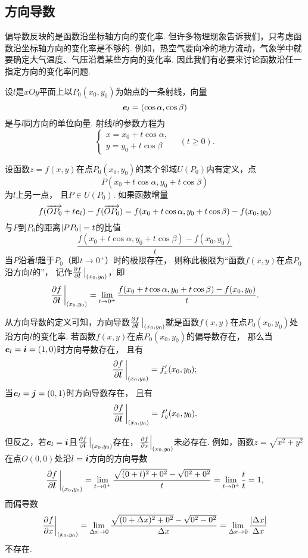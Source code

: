 \subsection{方向导数}
偏导数反映的是函数沿坐标轴方向的变化率.
但许多物理现象告诉我们，只考虑函数沿坐标轴方向的变化率是不够的.
例如，热空气要向冷的地方流动，气象学中就要确定大气温度、气压沿着某些方向的变化率.
因此我们有必要来讨论函数沿任一指定方向的变化率问题.

\begin{definition}
设\(l\)是\(xOy\)平面上以\(P_0(x_0,y_0)\)为始点的一条射线，向量\[
	\boldsymbol{e}_l=(\cos\alpha,\cos\beta)
\]是与\(l\)同方向的单位向量.
射线\(l\)的参数方程为\[
	\left\{ \begin{array}{l}
		x=x_0+t\cos\alpha, \\
		y=y_0+t\cos\beta
	\end{array} \right.
	\quad(t \geq 0).
\]

设函数\(z=f(x,y)\)在点\(P_0(x_0,y_0)\)的某个邻域\(U(P_0)\)内有定义，点\[
	P(x_0+t\cos\alpha,y_0+t\cos\beta)
\]为\(l\)上另一点，
且\(P \in U(P_0)\).
如果函数增量\[
	f(\overrightarrow{O P_0} + t \boldsymbol{e}_l) - f(\overrightarrow{O P_0})
	= f(x_0+t\cos\alpha,y_0+t\cos\beta)-f(x_0,y_0)
\]与\(P\)到\(P_0\)的距离\(\abs{PP_0}=t\)的比值\[
\frac{f(x_0+t\cos\alpha,y_0+t\cos\beta)-f(x_0,y_0)}{t}
\]当\(P\)沿着\(l\)趋于\(P_0\)（即\(t\to0^+\)）时的极限存在，
则称此极限为“函数\(f(x,y)\)在点\(P_0\)沿方向\(l\)的”，
记作\(\pdv{f}{\vb{l}}\eval_{(x_0,y_0)}\)，即\[
\pdv{f}{\vb{l}}\eval_{(x_0,y_0)}
=\lim\limits_{t\to0^+} \frac{f(x_0+t\cos\alpha,y_0+t\cos\beta)-f(x_0,y_0)}{t}.
\]
\end{definition}

从方向导数的定义可知，方向导数\(\pdv{f}{\vb{l}}\eval_{(x_0,y_0)}\)就是函数\(f(x,y)\)在点\(P_0(x_0,y_0)\)处沿方向\(l\)的变化率.
若函数\(f(x,y)\)在点\(P_0(x_0,y_0)\)的偏导数存在，
那么当\(\boldsymbol{e}_l = \boldsymbol{i} = (1,0)\)时方向导数存在，
且有\[
	\pdv{f}{\vb{l}}\eval_{(x_0,y_0)} = f'_x(x_0,y_0);
\]
当\(\boldsymbol{e}_l = \boldsymbol{j} = (0,1)\)时方向导数存在，
且有\[
	\pdv{f}{\vb{l}}\eval_{(x_0,y_0)} = f'_y(x_0,y_0).
\]

但反之，若\(\boldsymbol{e}_l = \boldsymbol{i}\)且\(\pdv{f}{\vb{l}}\eval_{(x_0,y_0)}\)存在，\(\eval{\pdv{f}{x}}_{(x_0,y_0)}\)未必存在.
例如，函数\(z = \sqrt{x^2+y^2}\)在点\(O(0,0)\)处沿\(l = \boldsymbol{i}\)方向的方向导数\[
\pdv{f}{\vb{l}}\eval_{(x_0,y_0)}
= \lim\limits_{t\to0^+} \frac{\sqrt{(0+t)^2+0^2}-\sqrt{0^2+0^2}}{t}
= \lim\limits_{t\to0^+} \frac{t}{t} = 1,
\]而偏导数\[
\eval{\pdv{f}{x}}_{(x_0,y_0)}
= \lim\limits_{\increment x\to0} \frac{\sqrt{(0+\increment x)^2+0^2}-\sqrt{0^2-0^2}}{\increment x}
= \lim\limits_{\increment x\to0} \frac{\abs{\increment x}}{\increment x}
\]不存在.

